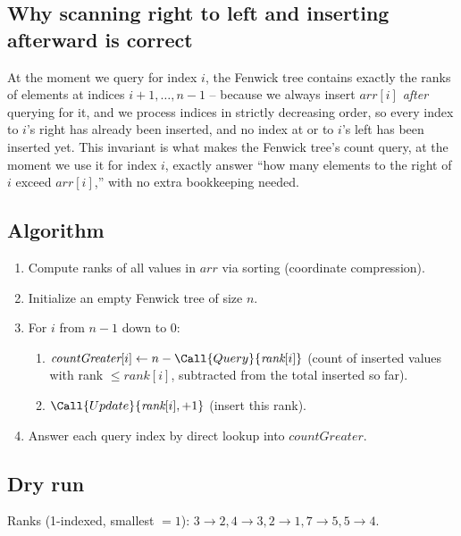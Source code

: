 \subsection*{Why scanning right to left and inserting afterward is correct}

At the moment we query for index $i$, the Fenwick tree contains exactly
the ranks of elements at indices $i+1, \dots, n-1$ -- because we always
insert $\textit{arr}[i]$ \emph{after} querying for it, and we process
indices in strictly decreasing order, so every index to $i$'s right has
already been inserted, and no index at or to $i$'s left has been inserted
yet. This invariant is what makes the Fenwick tree's count query, at the
moment we use it for index $i$, exactly answer ``how many elements to the
right of $i$ exceed $\textit{arr}[i]$,'' with no extra bookkeeping needed.

\subsection*{Algorithm}

\begin{enumerate}
  \item Compute ranks of all values in $\textit{arr}$ via sorting
        (coordinate compression).
  \item Initialize an empty Fenwick tree of size $n$.
  \item For $i$ from $n-1$ down to $0$:
  \begin{enumerate}
    \item $\textit{countGreater}[i] \gets n - \Call{Query}{\textit{rank}[i]}$
          (count of inserted values with rank $\le \textit{rank}[i]$,
          subtracted from the total inserted so far).
    \item $\Call{Update}{\textit{rank}[i], +1}$ (insert this rank).
  \end{enumerate}
  \item Answer each query index by direct lookup into
        $\textit{countGreater}$.
\end{enumerate}

\subsection*{Dry run}


Ranks (1-indexed, smallest $=1$): $3\to2, 4\to3, 2\to1, 7\to5, 5\to4$.


